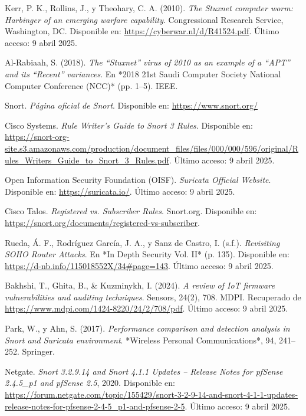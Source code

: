 \documentclass[11pt,a4paper,twoside]{report}
\begin{document}
\begin{thebibliography}{35}
	Kerr, P. K., Rollins, J., y Theohary, C. A. (2010). \textit{The Stuxnet computer worm: Harbinger of an emerging warfare capability}. Congressional Research Service, Washington, DC. Disponible en: \url{https://cyberwar.nl/d/R41524.pdf}. Último acceso: 9 abril 2025.
	
	Al-Rabiaah, S. (2018). \textit{The “Stuxnet” virus of 2010 as an example of a “APT” and its “Recent” variances}. En *2018 21st Saudi Computer Society National Computer Conference (NCC)* (pp. 1--5). IEEE.
	
	Snort. \textit{Página oficial de Snort}. Disponible en: \url{https://www.snort.org/}
	
	Cisco Systems. \textit{Rule Writer’s Guide to Snort 3 Rules}. Disponible en: \url{https://snort-org-site.s3.amazonaws.com/production/document_files/files/000/000/596/original/Rules_Writers_Guide_to_Snort_3_Rules.pdf}. Último acceso: 9 abril 2025.
	
	Open Information Security Foundation (OISF). \textit{Suricata Official Website}. Disponible en: \url{https://suricata.io/}. Último acceso: 9 abril 2025.
	
	Cisco Talos. \textit{Registered vs. Subscriber Rules}. Snort.org. Disponible en: \url{https://snort.org/documents/registered-vs-subscriber}.
	
	Rueda, Á. F., Rodríguez García, J. A., y Sanz de Castro, I. (s.f.). \textit{Revisiting SOHO Router Attacks}. En *In Depth Security Vol. II* (p. 135). Disponible en: \url{https://d-nb.info/115018552X/34#page=143}. Último acceso: 9 abril 2025.
	
	Bakhshi, T., Ghita, B., \& Kuzminykh, I. (2024). \textit{A review of IoT firmware vulnerabilities and auditing techniques}. Sensors, 24(2), 708. MDPI. Recuperado de \url{https://www.mdpi.com/1424-8220/24/2/708/pdf}. Último acceso: 9 abril 2025.
	
	Park, W., y Ahn, S. (2017). \textit{Performance comparison and detection analysis in Snort and Suricata environment}. *Wireless Personal Communications*, 94, 241--252. Springer.
	
	Netgate. \textit{Snort 3.2.9.14 and Snort 4.1.1 Updates – Release Notes for pfSense 2.4.5\_p1 and pfSense 2.5}, 2020. Disponible en: \url{https://forum.netgate.com/topic/155429/snort-3-2-9-14-and-snort-4-1-1-updates-release-notes-for-pfsense-2-4-5_p1-and-pfsense-2-5}. Último acceso: 9 abril 2025.	
	

\end{thebibliography}
\end{document}
